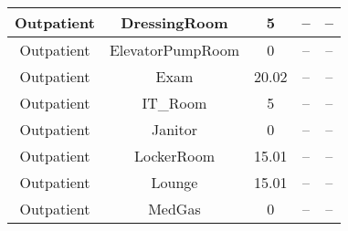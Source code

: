 \begin{table}
\begin{tabular}{|c|c|c|c|c|}
Outpatient             & DressingRoom            & 5                                                                                                             & --                                & --                                                                                                             \\ \hline
Outpatient             & ElevatorPumpRoom        & 0                                                                                                             & --                                & --                                                                                                             \\ \hline
Outpatient             & Exam                    & 20.02                                                                                                         & --                                & --                                                                                                             \\ \hline
Outpatient             & IT\_Room                & 5                                                                                                             & --                                & --                                                                                                             \\ \hline
Outpatient             & Janitor                 & 0                                                                                                             & --                                & --                                                                                                             \\ \hline
Outpatient             & LockerRoom              & 15.01                                                                                                         & --                                & --                                                                                                             \\ \hline
Outpatient             & Lounge                  & 15.01                                                                                                         & --                                & --                                                                                                             \\ \hline
Outpatient             & MedGas                  & 0                                                                                                             & --                                & --                                                                                                             \\ \hline

\end{tabular}
\end{table}
